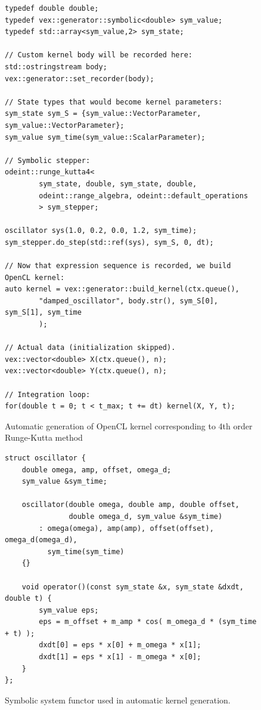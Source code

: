 \documentclass[1p]{elsarticle}
\begin{document}
\begin{figure}[p]
\begin{lstlisting}
typedef double double;
typedef vex::generator::symbolic<double> sym_value;
typedef std::array<sym_value,2> sym_state;

// Custom kernel body will be recorded here:
std::ostringstream body;
vex::generator::set_recorder(body);

// State types that would become kernel parameters:
sym_state sym_S = {sym_value::VectorParameter, sym_value::VectorParameter};
sym_value sym_time(sym_value::ScalarParameter);

// Symbolic stepper:
odeint::runge_kutta4<
        sym_state, double, sym_state, double,
        odeint::range_algebra, odeint::default_operations
        > sym_stepper;

oscillator sys(1.0, 0.2, 0.0, 1.2, sym_time);
sym_stepper.do_step(std::ref(sys), sym_S, 0, dt);

// Now that expression sequence is recorded, we build OpenCL kernel:
auto kernel = vex::generator::build_kernel(ctx.queue(),
        "damped_oscillator", body.str(), sym_S[0], sym_S[1], sym_time
        );

// Actual data (initialization skipped).
vex::vector<double> X(ctx.queue(), n);
vex::vector<double> Y(ctx.queue(), n);

// Integration loop:
for(double t = 0; t < t_max; t += dt) kernel(X, Y, t);
\end{lstlisting}
\caption{Automatic generation of OpenCL kernel corresponding to 4th order
Runge-Kutta method}
\label{code:krnbuilder}
\end{figure}

\begin{figure}[p]
\begin{lstlisting}
struct oscillator {
    double omega, amp, offset, omega_d;
    sym_value &sym_time;

    oscillator(double omega, double amp, double offset,
               double omega_d, sym_value &sym_time)
        : omega(omega), amp(amp), offset(offset), omega_d(omega_d),
          sym_time(sym_time)
    {}

    void operator()(const sym_state &x, sym_state &dxdt, double t) {
        sym_value eps;
        eps = m_offset + m_amp * cos( m_omega_d * (sym_time + t) );
        dxdt[0] = eps * x[0] + m_omega * x[1];
        dxdt[1] = eps * x[1] - m_omega * x[0];
    }
};
\end{lstlisting}
\caption{Symbolic system functor used in automatic kernel generation.}
\label{code:symsysfunc}
\end{figure}
\end{document}

